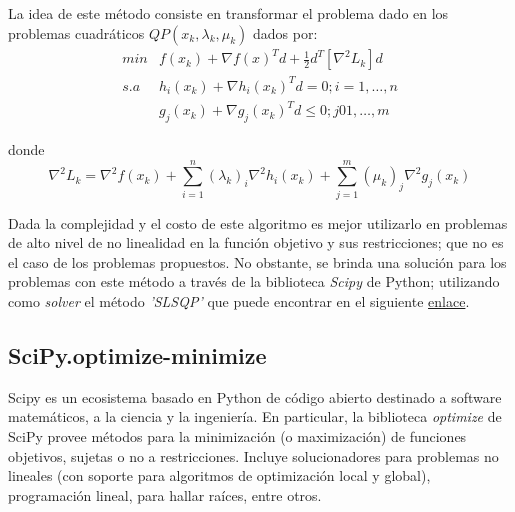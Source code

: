 \documentclass[titlepage, 11pt]{scrartcl}
\begin{document}
	La idea de este método consiste en transformar el problema dado en los problemas cuadráticos $QP(x_k, \lambda_k, \mu_k)$ dados por:
	\begin{align*}
		min &f(x_k) + \nabla f(x)^Td + \frac{1}{2}d^T[\nabla^2L_k]d\\
		s.a &h_i(x_k) + \nabla h_i(x_k)^Td = 0; i = 1, \ldots, n\\
		&g_j(x_k) + \nabla g_j(x_k)^T d \leq 0; j 0 1, \ldots, m
	\end{align*}
	
	donde
	\begin{equation*}
		\nabla^2 L_k = \nabla^2f(x_k) + \sum_{i = 1}^{n}(\lambda_k)_i\nabla^2h_i(x_k) + \sum_{j = 1}^{m}(\mu_k)_j\nabla^2g_j(x_k)
	\end{equation*}
	
	
	Dada la complejidad y el costo de este algoritmo es mejor utilizarlo en problemas de alto nivel de no linealidad en la función objetivo y sus restricciones; que no es el caso de los problemas propuestos. No obstante, se brinda una solución para los problemas con este método a través de la biblioteca \textit{Scipy} de Python; utilizando como \textit{solver} el método \textit{'SLSQP'} que puede encontrar en el siguiente \href{methods.py}{enlace}.
	
	\subsection{SciPy.optimize-minimize}
	Scipy es un ecosistema basado en Python de código abierto destinado a software matemáticos, a la ciencia y la ingeniería. En particular, la biblioteca \textit{optimize} de SciPy provee métodos para la minimización (o maximización) de funciones objetivos, sujetas o no a restricciones. Incluye solucionadores para problemas no lineales (con soporte para algoritmos de optimización local y global), programación lineal, para hallar raíces, entre otros.
	
\end{document}
